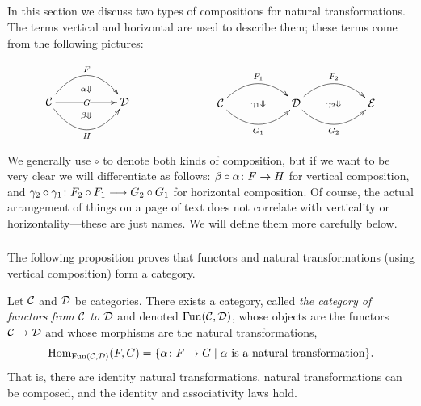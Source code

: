 \documentclass[CT4S-EN-RU]{subfiles}
\begin{document}
\subsection{}\label{sec:vert and hor}

In this section we discuss two types of compositions for natural transformations. The terms vertical and horizontal are used to describe them; these terms come from the following pictures:

$$
\parbox{1in}{\xymatrix{&\ar@{}[d]|(.65){\alpha\Down}\\\mcC\ar@/^2pc/[rr]^F\ar[rr]|G\ar@/_2pc/[rr]_H&&\mcD\\&\ar@{}[u]|(.65){\beta\Down}}}
\hspace{1in}
\parbox{2in}{\xymatrix{\mcC\ar@/^1.5pc/[rr]^{F_1}\ar@{}[rr]|{\gamma_1\Down}\ar@/_1.5pc/[rr]_{G_1}&&\mcD\ar@/^1.5pc/[rr]^{F_2}\ar@{}[rr]|{\gamma_2\Down}\ar@/_1.5pc/[rr]_{G_2}&&\mcE}}
$$
We generally use $\circ$ to denote both kinds of composition, but if we want to be very clear we will differentiate as follows: $\beta\circ\alpha\colon F\rightarrow H$ for vertical composition, and $\gamma_2\diamond\gamma_1\colon F_2\circ F_1\longrightarrow G_2\circ G_1$ for horizontal composition. Of course, the actual arrangement of things on a page of text does not correlate with verticality or horizontality—these are just names. We will define them more carefully below.


\subsubsection{}

The following proposition proves that functors and natural transformations (using vertical composition) form a category.

\begin{proposition}\label{prop:Fun(C,D)}

Let $\mathcal{C}$ and $\mathcal{D}$ be categories. There exists a category, called {\em the category of functors from $\mathcal{C}$ to $\mathcal{D}$} and denoted $\textnormal{Fun}(\mathcal{C},\mathcal{D})$, whose objects are the functors $\mathcal{C}\rightarrow\mathcal{D}$ and whose morphisms are the natural transformations,
$$\textnormal{Hom}_{\textnormal{Fun}(\mathcal{C},\mathcal{D})}(F,G)=\{\alpha\colon F\rightarrow G{\;|\;}\alpha\textnormal{ is a natural transformation}\}.$$That is, there are identity natural transformations, natural transformations can be composed, and the identity and associativity laws hold.

\end{proposition}
\end{document}
